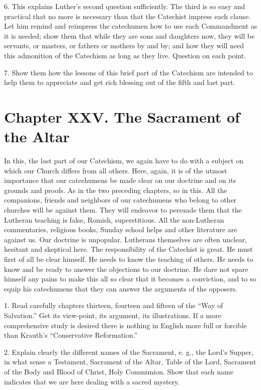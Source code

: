 6. This explains Luther’s second question sufficiently. The third is so easy and practical that no
more is necessary than that the Catechist impress each clause. Let him remind and reimpress the catechumen how to use each Commandment as it is needed; show them that while they are sons and daughters now, they will be servants, or masters, or fathers or mothers by and by; and how they will need this admonition of the Catechism as long as they live. Question on each point. 

7. Show them how the lessons of this brief part of the Catechism are intended to help them to appreciate and get rich blessing out of the fifth and last part.

\chapter{Chapter XXV. The Sacrament of the Altar}

In this, the last part of our Catechism, we again have to do with a subject on which our Church differs from all others. Here, again, it is of the utmost importance that our catechumens be made clear on our doctrine and on its grounds and proofs. As in the two preceding chapters, so in this. All the companions, friends and neighbors of our catechumens who belong to other churches will be against them. They will endeavor to persuade them that the Lutheran teaching is false, Romish, superstitious. All the non-Lutheran commentaries, religious books, Sunday school helps and other literature are against us. Our doctrine is unpopular. Lutherans themselves are often unclear, hesitant and skeptical here. The responsibility of the Catechist is great. He must first of all be clear himself. He needs to know the teaching of others. He needs to know and be ready to answer the objections to our doctrine. He dare not spare himself any pains to make this all so clear that it becomes a conviction, and to so equip his catechumens that they can answer the arguments of the opposers. 

1. Read carefully chapters thirteen, fourteen and
fifteen of the “Way of Salvation.” Get its view-point, its argument, its illustrations. If a more comprehensive study is desired there is nothing in English more full or forcible than Krauth’s “Conservative Reformation.”

2. Explain clearly the different names of the Sacrament, e. g., the Lord’s Supper, in what sense a Testament, Sacrament of the Altar, Table of the Lord, Sacrament of the Body and Blood of Christ, Holy Communion. Show that each name indicates that we are here dealing with a sacred mystery. 

